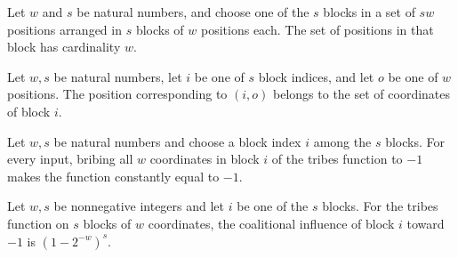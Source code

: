 \begin{theorem}
\label{FABL.card_tribesBlockCoordinates}
\leanok
{}
Let $w$ and $s$ be natural numbers, and choose one of the $s$ blocks in a set of $sw$
positions arranged in $s$ blocks of $w$ positions each. The set of positions in that
block has cardinality $w$.
\end{theorem}

\begin{theorem}
\label{FABL.mem_tribesBlockCoordinates}
\leanok
{}
Let $w,s$ be natural numbers, let $i$ be one of $s$ block indices, and let $o$ be one of
$w$ positions. The position corresponding to $(i,o)$ belongs to the set of coordinates
of block $i$.
\end{theorem}

\begin{theorem}
\label{FABL.bribeFunction_tribes_block_neg_one}
\leanok
{}
Let $w,s$ be natural numbers and choose a block index $i$ among the $s$ blocks. For
every input, bribing all $w$ coordinates in block $i$ of the tribes function to $-1$
makes the function constantly equal to $-1$.
\end{theorem}

\begin{theorem}
\label{FABL.coalitionalInfluenceToward_tribes_block_neg_one}
\leanok
{}
Let $w,s$ be nonnegative integers and let $i$ be one of the $s$ blocks. For the tribes
function on $s$ blocks of $w$ coordinates, the coalitional influence of block $i$ toward
$-1$ is $(1-2^{-w})^s$.
\end{theorem}

